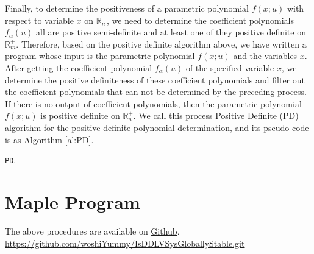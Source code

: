 \documentclass[10pt,a4paper]{article}
\begin{document}
Finally, to determine the positiveness of a parametric polynomial $f(x;u)$ with respect to variable $x$ on $\mathbb{R}_n^+$, we need to determine the coefficient polynomials $f_\alpha(u)$ all are positive semi-definite and at least one of they positive definite on $\mathbb{R}_m^+$. Therefore, based on the positive definite algorithm above, we have written a program whose input is the parametric polynomial $f(x;u)$ and the variables $x$. After getting the coefficient polynomial $f_\alpha(u)$ of the specified variable $x$, we determine the positive definiteness of these coefficient polynomials and filter out the coefficient polynomials that can not be determined by the preceding process. If there is no output of coefficient polynomials, then the parametric polynomial $f(x;u)$ is positive definite on $\mathbb{R}_n^+$. We call this process Positive Definite (PD) algorithm for the positive definite polynomial determination, and its pseudo-code is as Algorithm \ref{al:PD}.
\begin{algorithm}[!ht]
  \caption{\texttt{PD}.}\label{al:PD}
\end{algorithm}

\appendix

\section{Maple Program}

The above procedures are available on \href{https://github.com/woshiYummy/IsDDLVSysGloballyStable.git}{Github}.\\
\url{https://github.com/woshiYummy/IsDDLVSysGloballyStable.git}
\end{document}
